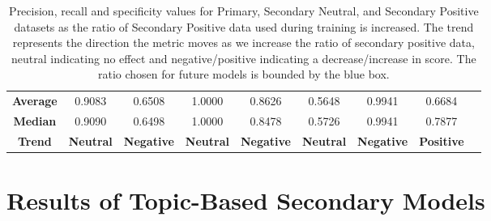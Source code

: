 \begin{table}[ht]
{\begin{tabular}{ccccccccc}
            \midrule
            \textbf{Average}                      & 0.9083                                        & 0.6508                                         & 1.0000                      & 0.8626             & 0.5648           & 0.9941               & 0.6684              \\
            \textbf{Median}                       & 0.9090                                        & 0.6498                                         & 1.0000                      & 0.8478             & 0.5726           & 0.9941               & 0.7877              \\
            \midrule
            \textbf{Trend}                        & \textbf{Neutral}                              & \textbf{Negative}                              & \textbf{Neutral}            & \textbf{Negative}  & \textbf{Neutral} & \textbf{Negative}    & \textbf{Positive}   \\
            \bottomrule
        \end{tabular}%
    }
    \vspace{5pt}
    \caption{Precision, recall and specificity values for Primary, Secondary Neutral, and Secondary Positive datasets as the ratio of Secondary Positive data used during training is increased. The trend represents the direction the metric moves as we increase the ratio of secondary positive data, neutral indicating no effect and negative/positive indicating a decrease/increase in score. The ratio chosen for future models is bounded by the blue box.}
    \label{tab:ratio_test}
\end{table}

\chapter{Results of Topic-Based Secondary Models}
\label{app:topic_results}

